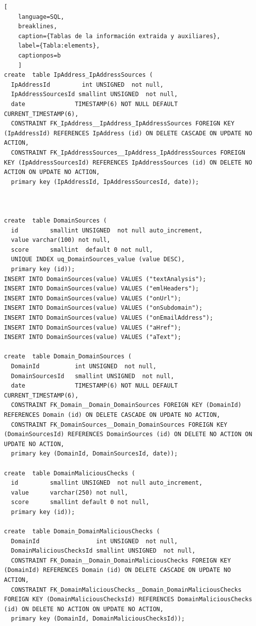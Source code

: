 \begin{lstlisting}[
    language=SQL,
    breaklines, 
    caption={Tablas de la información extraida y auxiliares}, 
    label={Tabla:elements}, 
    captionpos=b
    ]
create  table IpAddress_IpAddressSources (
  IpAddressId         int UNSIGNED  not null, 
  IpAddressSourcesId smallint UNSIGNED  not null,
  date              TIMESTAMP(6) NOT NULL DEFAULT CURRENT_TIMESTAMP(6),
  CONSTRAINT FK_IpAddress__IpAddress_IpAddressSources FOREIGN KEY (IpAddressId) REFERENCES IpAddress (id) ON DELETE CASCADE ON UPDATE NO ACTION,
  CONSTRAINT FK_IpAddressSources__IpAddress_IpAddressSources FOREIGN KEY (IpAddressSourcesId) REFERENCES IpAddressSources (id) ON DELETE NO ACTION ON UPDATE NO ACTION,
  primary key (IpAddressId, IpAddressSourcesId, date));



create  table DomainSources (
  id         smallint UNSIGNED  not null auto_increment, 
  value varchar(100) not null, 
  score      smallint  default 0 not null, 
  UNIQUE INDEX uq_DomainSources_value (value DESC),
  primary key (id));
INSERT INTO DomainSources(value) VALUES ("textAnalysis");
INSERT INTO DomainSources(value) VALUES ("emlHeaders");
INSERT INTO DomainSources(value) VALUES ("onUrl");
INSERT INTO DomainSources(value) VALUES ("onSubdomain");
INSERT INTO DomainSources(value) VALUES ("onEmailAddress");
INSERT INTO DomainSources(value) VALUES ("aHref");
INSERT INTO DomainSources(value) VALUES ("aText");

create  table Domain_DomainSources (
  DomainId          int UNSIGNED  not null, 
  DomainSourcesId   smallint UNSIGNED  not null,
  date              TIMESTAMP(6) NOT NULL DEFAULT CURRENT_TIMESTAMP(6),
  CONSTRAINT FK_Domain__Domain_DomainSources FOREIGN KEY (DomainId) REFERENCES Domain (id) ON DELETE CASCADE ON UPDATE NO ACTION,
  CONSTRAINT FK_DomainSources__Domain_DomainSources FOREIGN KEY (DomainSourcesId) REFERENCES DomainSources (id) ON DELETE NO ACTION ON UPDATE NO ACTION,
  primary key (DomainId, DomainSourcesId, date));

create  table DomainMaliciousChecks (
  id         smallint UNSIGNED  not null auto_increment, 
  value      varchar(250) not null, 
  score      smallint default 0 not null, 
  primary key (id));

create  table Domain_DomainMaliciousChecks (
  DomainId                int UNSIGNED  not null, 
  DomainMaliciousChecksId smallint UNSIGNED  not null,
  CONSTRAINT FK_Domain__Domain_DomainMaliciousChecks FOREIGN KEY (DomainId) REFERENCES Domain (id) ON DELETE CASCADE ON UPDATE NO ACTION,
  CONSTRAINT FK_DomainMaliciousChecks__Domain_DomainMaliciousChecks FOREIGN KEY (DomainMaliciousChecksId) REFERENCES DomainMaliciousChecks (id) ON DELETE NO ACTION ON UPDATE NO ACTION,
  primary key (DomainId, DomainMaliciousChecksId));





\end{lstlisting}
